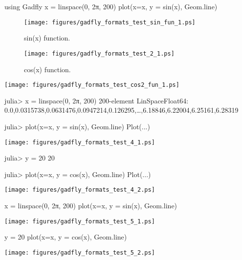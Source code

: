 \begin{juliacode}
using Gadfly
x = linspace(0, 2π, 200)
plot(x=x, y = sin(x), Geom.line)
\end{juliacode}
\begin{figure}[ht]
\center
\texttt{[image: figures/gadfly\_formats\_test\_sin\_fun\_1.ps]}
\caption{sin(x) function.}
\label{fig:sin_fun}
\end{figure}

\begin{figure}[htpb]
\center
\texttt{[image: figures/gadfly\_formats\_test\_2\_1.ps]}
\caption{cos(x) function.}
\end{figure}

\texttt{[image: figures/gadfly\_formats\_test\_cos2\_fun\_1.ps]}

\begin{juliaterm}
julia> x = linspace(0, 2π, 200)
200-element LinSpace{Float64}:
 0.0,0.0315738,0.0631476,0.0947214,0.126295,…,6.18846,6.22004,6.25161,6.28319

julia> plot(x=x, y = sin(x), Geom.line)
Plot(...)

\end{juliaterm}
\texttt{[image: figures/gadfly\_formats\_test\_4\_1.ps]}

\begin{juliaterm}
julia> y = 20
20

julia> plot(x=x, y = cos(x), Geom.line)
Plot(...)

\end{juliaterm}
\texttt{[image: figures/gadfly\_formats\_test\_4\_2.ps]}

\begin{juliacode}
x = linspace(0, 2π, 200)
plot(x=x, y = sin(x), Geom.line)
\end{juliacode}
\texttt{[image: figures/gadfly\_formats\_test\_5\_1.ps]}

\begin{juliacode}
y = 20
plot(x=x, y = cos(x), Geom.line)
\end{juliacode}
\texttt{[image: figures/gadfly\_formats\_test\_5\_2.ps]}
